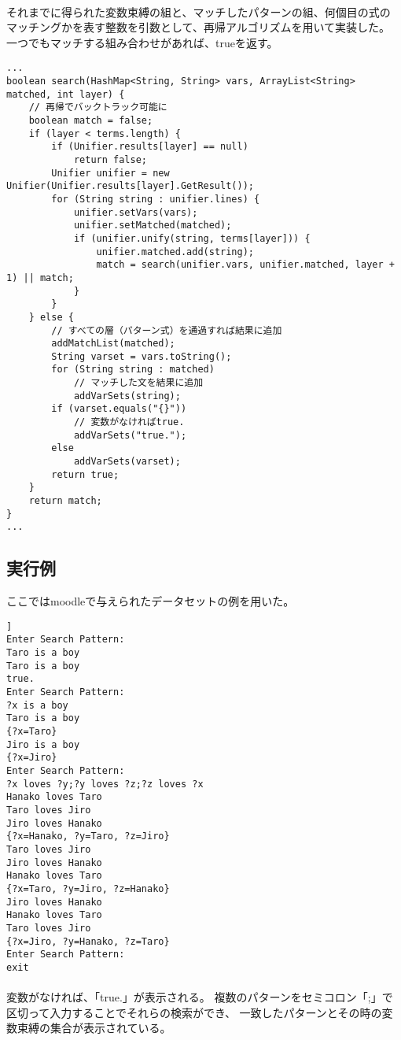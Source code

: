 \documentclass{jarticle}
\begin{document}
    \paragraph{}
    それまでに得られた変数束縛の組と、マッチしたパターンの組、何個目の式の
    マッチングかを表す整数を引数として、再帰アルゴリズムを用いて実装した。
    一つでもマッチする組み合わせがあれば、trueを返す。
\begin{lstlisting}[caption=searchメソッド]
...
boolean search(HashMap<String, String> vars, ArrayList<String> matched, int layer) {
    // 再帰でバックトラック可能に
    boolean match = false;
    if (layer < terms.length) {
        if (Unifier.results[layer] == null)
            return false;
        Unifier unifier = new Unifier(Unifier.results[layer].GetResult());
        for (String string : unifier.lines) {
            unifier.setVars(vars);
            unifier.setMatched(matched);
            if (unifier.unify(string, terms[layer])) {
                unifier.matched.add(string);
                match = search(unifier.vars, unifier.matched, layer + 1) || match;
            }
        }
    } else {
        // すべての層（パターン式）を通過すれば結果に追加
        addMatchList(matched);
        String varset = vars.toString();
        for (String string : matched)
            // マッチした文を結果に追加
            addVarSets(string);
        if (varset.equals("{}"))
            // 変数がなければtrue.
            addVarSets("true.");
        else
            addVarSets(varset);
        return true;
    }
    return match;
}
...
\end{lstlisting}

\subsection{実行例}
ここではmoodleで与えられたデータセットの例を用いた。
\begin{lstlisting}[caption=Unify.javaの実行例]]
Enter Search Pattern:
Taro is a boy
Taro is a boy
true.
Enter Search Pattern:
?x is a boy  
Taro is a boy
{?x=Taro}
Jiro is a boy
{?x=Jiro}
Enter Search Pattern:
?x loves ?y;?y loves ?z;?z loves ?x
Hanako loves Taro
Taro loves Jiro
Jiro loves Hanako
{?x=Hanako, ?y=Taro, ?z=Jiro}
Taro loves Jiro
Jiro loves Hanako
Hanako loves Taro
{?x=Taro, ?y=Jiro, ?z=Hanako}
Jiro loves Hanako
Hanako loves Taro
Taro loves Jiro
{?x=Jiro, ?y=Hanako, ?z=Taro}
Enter Search Pattern:
exit
\end{lstlisting}
    \paragraph{}
    変数がなければ、「true.」が表示される。
    複数のパターンをセミコロン「;」で区切って入力することでそれらの検索ができ、
    一致したパターンとその時の変数束縛の集合が表示されている。
\end{document}
